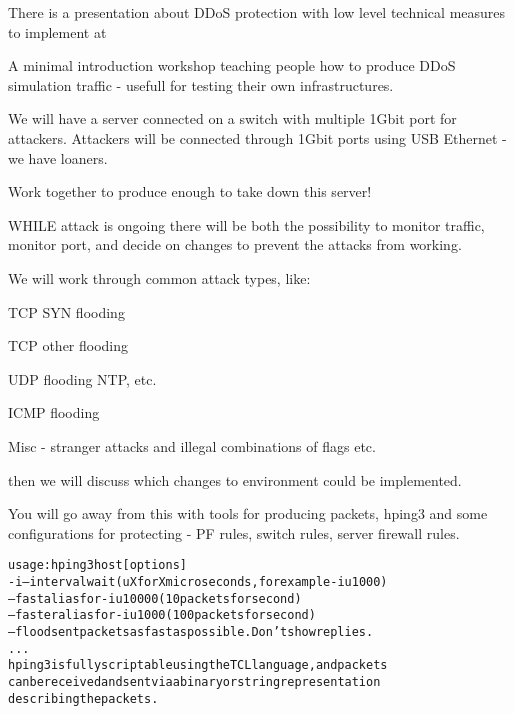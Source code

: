 \documentclass[Screen16to9,17pt]{foils}
\begin{document}
There is a presentation about DDoS protection with low level technical measures to implement at\\
{\footnotesize {}}





A minimal introduction workshop teaching people how to produce DDoS simulation traffic - usefull for testing their own infrastructures.

We will have a server connected on a switch with multiple 1Gbit port for attackers. Attackers will be connected through 1Gbit ports using USB Ethernet - we have loaners.

Work together to produce enough to take down this server!

WHILE attack is ongoing there will be both the possibility to monitor traffic, monitor port, and decide on changes to prevent the attacks from working.


We will work through common attack types, like:

\begin{list2}
\item TCP SYN flooding
\item TCP other flooding
\item UDP flooding NTP, etc.
\item ICMP flooding
\item Misc - stranger attacks and illegal combinations of flags etc.
\end{list2}

then we will discuss which changes to environment could be implemented.

You will go away from this with tools for producing packets, hping3 and some configurations for protecting - PF rules, switch rules, server firewall rules.




\begin{alltt}\footnotesize
usage: hping3 host [options]
  -i  --interval  wait (uX for X microseconds, for example -i u1000)
      --fast      alias for -i u10000 (10 packets for second)
      --faster    alias for -i u1000 (100 packets for second)
      --flood	   sent packets as fast as possible. Don't show replies.
...
hping3 is fully scriptable using the TCL language, and packets
can be received and sent via a binary or string representation
describing the packets.
\end{alltt}
\end{document}
